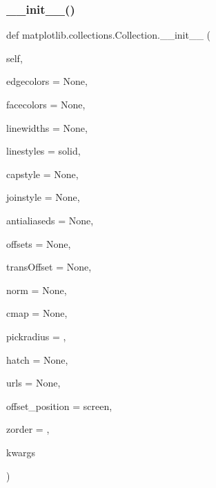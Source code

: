 \subsubsection{\texorpdfstring{\+\_\+\+\_\+init\+\_\+\+\_\+()}{\_\_init\_\_()}}
{\footnotesize\ttfamily def matplotlib.\+collections.\+Collection.\+\_\+\+\_\+init\+\_\+\+\_\+ (\begin{DoxyParamCaption}\item[{}]{self,  }\item[{}]{edgecolors = {\ttfamily None},  }\item[{}]{facecolors = {\ttfamily None},  }\item[{}]{linewidths = {\ttfamily None},  }\item[{}]{linestyles = {\ttfamily \textquotesingle{}solid\textquotesingle{}},  }\item[{}]{capstyle = {\ttfamily None},  }\item[{}]{joinstyle = {\ttfamily None},  }\item[{}]{antialiaseds = {\ttfamily None},  }\item[{}]{offsets = {\ttfamily None},  }\item[{}]{trans\+Offset = {\ttfamily None},  }\item[{}]{norm = {\ttfamily None},  }\item[{}]{cmap = {\ttfamily None},  }\item[{}]{pickradius = {},  }\item[{}]{hatch = {\ttfamily None},  }\item[{}]{urls = {\ttfamily None},  }\item[{}]{offset\+\_\+position = {\ttfamily \textquotesingle{}screen\textquotesingle{}},  }\item[{}]{zorder = {},  }\item[{}]{kwargs }\end{DoxyParamCaption})}

